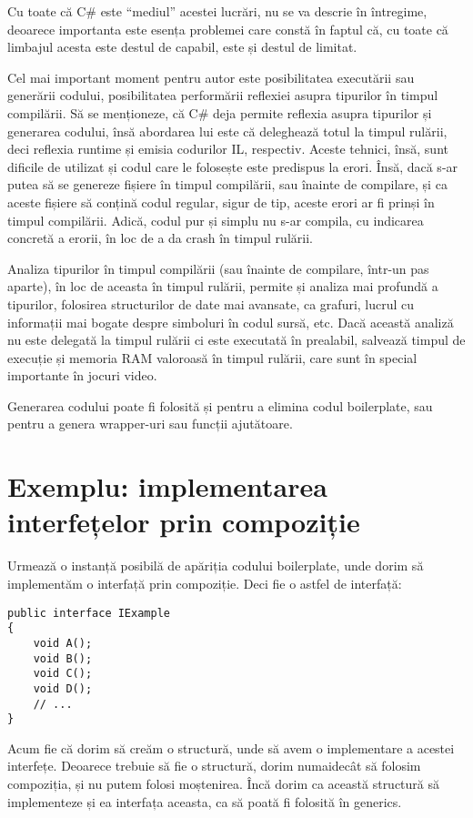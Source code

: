 \documentclass[a4paper,12pt]{report}
\begin{document}
Cu toate că C\# este ``mediul'' acestei lucrări, nu se va descrie în întregime,
deoarece importanta este esența problemei care constă în faptul că, cu toate că limbajul acesta este destul de capabil, este și destul de limitat.

Cel mai important moment pentru autor este posibilitatea executării sau generării codului,
posibilitatea performării reflexiei asupra tipurilor în timpul compilării.
Să se menționeze, că C\# deja permite reflexia asupra tipurilor și generarea codului, însă abordarea lui este că deleghează totul la timpul rulării, deci reflexia runtime și emisia codurilor IL, respectiv.
Aceste tehnici, însă, sunt dificile de utilizat și codul care le folosește este predispus la erori.
Însă, dacă s-ar putea să se genereze fișiere în timpul compilării, sau înainte de compilare, și ca aceste fișiere să conțină codul regular, sigur de tip, aceste erori ar fi prinși în timpul compilării.
Adică, codul pur și simplu nu s-ar compila, cu indicarea concretă a erorii, în loc de a da crash în timpul rulării.

Analiza tipurilor în timpul compilării (sau înainte de compilare, într-un pas aparte), în loc de aceasta în timpul rulării, permite și analiza mai profundă a tipurilor, folosirea structurilor de date mai avansate, ca grafuri, lucrul cu informații mai bogate despre simboluri în codul sursă, etc.
Dacă această analiză nu este delegată la timpul rulării ci este executată în prealabil, salvează timpul de execuție și memoria RAM valoroasă în timpul rulării, care sunt în special importante în jocuri video.

Generarea codului poate fi folosită și pentru a elimina codul boilerplate, sau pentru a genera wrapper-uri sau funcții ajutătoare.

\section{Exemplu: implementarea interfețelor prin compoziție}

Urmează o instanță posibilă de apăriția codului boilerplate, unde dorim să implementăm o interfață prin compoziție\cite{composition_interface_boilerplate}.
Deci fie o astfel de interfață:

\begin{verbatim}
public interface IExample
{
    void A();
    void B();
    void C();
    void D();
    // ...
}
\end{verbatim}

Acum fie că dorim să creăm o structură, unde să avem o implementare a acestei interfețe.
Deoarece trebuie să fie o structură, dorim numaidecât să folosim compoziția, și nu putem folosi moștenirea.
Încă dorim ca această structură să implementeze și ea interfața aceasta, ca să poată fi folosită în generics.
\end{document}
